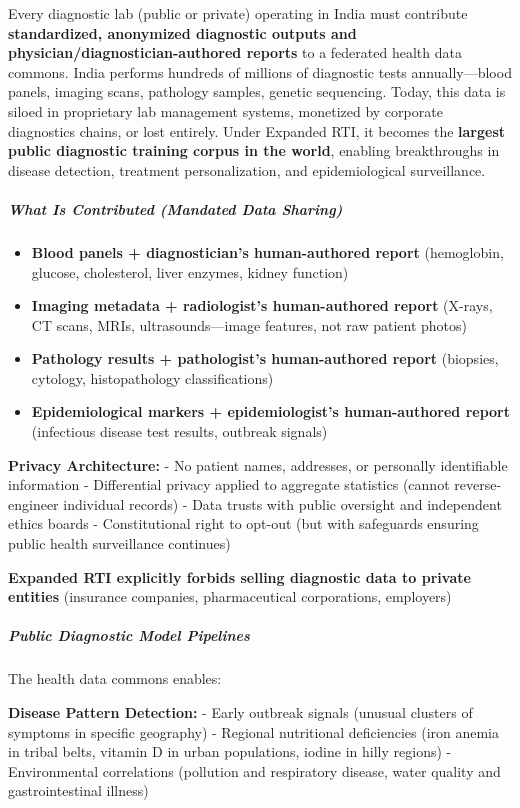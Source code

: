 Every diagnostic lab (public or private) operating in India must
contribute \textbf{standardized, anonymized diagnostic outputs and
physician/diagnostician-authored reports} to a federated health data
commons. India performs hundreds of millions of diagnostic tests
annually---blood panels, imaging scans, pathology samples, genetic
sequencing. Today, this data is siloed in proprietary lab management
systems, monetized by corporate diagnostics chains, or lost entirely.
Under Expanded RTI, it becomes the \textbf{largest public diagnostic
training corpus in the world}, enabling breakthroughs in disease
detection, treatment personalization, and epidemiological surveillance.

\subparagraph{What Is Contributed (Mandated Data
Sharing)}\label{what-is-contributed-mandated-data-sharing}

\begin{itemize}
\tightlist
\item
  \textbf{Blood panels + diagnostician's human-authored report}
  (hemoglobin, glucose, cholesterol, liver enzymes, kidney function)
\item
  \textbf{Imaging metadata + radiologist's human-authored report}
  (X-rays, CT scans, MRIs, ultrasounds---image features, not raw patient
  photos)
\item
  \textbf{Pathology results + pathologist's human-authored report}
  (biopsies, cytology, histopathology classifications)
\item
  \textbf{Epidemiological markers + epidemiologist's human-authored
  report} (infectious disease test results, outbreak signals)
\end{itemize}

\textbf{Privacy Architecture:} - No patient names, addresses, or
personally identifiable information - Differential privacy applied to
aggregate statistics (cannot reverse-engineer individual records) - Data
trusts with public oversight and independent ethics boards -
Constitutional right to opt-out (but with safeguards ensuring public
health surveillance continues)

\textbf{Expanded RTI explicitly forbids selling diagnostic data to
private entities} (insurance companies, pharmaceutical corporations,
employers)

\subparagraph{Public Diagnostic Model
Pipelines}\label{public-diagnostic-model-pipelines}

The health data commons enables:

\textbf{Disease Pattern Detection:} - Early outbreak signals (unusual
clusters of symptoms in specific geography) - Regional nutritional
deficiencies (iron anemia in tribal belts, vitamin D in urban
populations, iodine in hilly regions) - Environmental correlations
(pollution and respiratory disease, water quality and gastrointestinal
illness)

